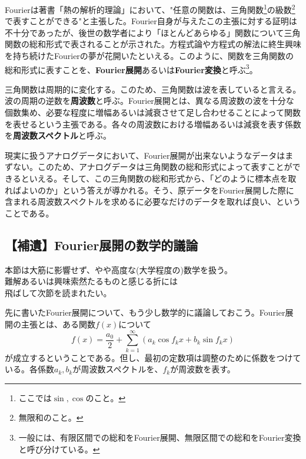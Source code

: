 Fourierは著書「熱の解析的理論」において、"任意の関数は、三角関数\footnote{ここでは$\sin,\cos$のこと。}の級数\footnote{無限和のこと。}で表すことができる"と主張した。Fourier自身が与えたこの主張に対する証明は不十分であったが、後世の数学者により「ほとんどあらゆる」関数について三角関数の総和形式で表されることが示された。方程式論や方程式の解法に終生興味を持ち続けたFourierの夢が花開いたといえる。このように、関数を三角関数の総和形式に表すことを、\textbf{Fourier展開}あるいは\textbf{Fourier変換}と呼ぶ\footnote{一般には、有限区間での総和をFourier展開、無限区間での総和をFourier変換と呼び分けている。}。

三角関数は周期的に変化する。このため、三角関数は波を表していると言える。波の周期の逆数を\textbf{周波数}と呼ぶ。Fourier展開とは、異なる周波数の波を十分な個数集め、必要な程度に増幅あるいは減衰させて足し合わせることによって関数を表せるという主張である。各々の周波数における増幅あるいは減衰を表す係数を\textbf{周波数スペクトル}と呼ぶ。

現実に扱うアナログデータにおいて、Fourier展開が出来ないようなデータはまずない。このため、アナログデータは三角関数の総和形式によって表すことができるといえる。そして、この三角関数の総和形式から、「どのように標本点を取ればよいのか」という答えが導かれる。そう、原データをFourier展開した際に含まれる周波数スペクトルを求めるに必要なだけのデータを取れば良い、ということである。

\subsection{【補遺】Fourier展開の数学的議論}
\begin{center}
\begin{minipage}[]{0.75\linewidth}
\begin{screen}
\begin{center}
本節は大筋に影響せず、やや高度な(大学程度の)数学を扱う。\\
難解あるいは興味索然たるものと感じる折には\\
飛ばして次節を読まれたい。
\end{center}
\end{screen}
\end{minipage}
\end{center}

先に書いたFourier展開について、もう少し数学的に議論しておこう。Fourier展開の主張とは、ある関数$f(x)$について
\begin{equation}
f(x)=\frac{a_0}{2} + \sum^{\infty}_{k=1} \left( a_k \cos f_kx + b_k \sin f_kx \right) \label{eq_2_1}
\end{equation}
が成立するということである。但し、最初の定数項は調整のために係数をつけている。各係数$a_k,b_k$が周波数スペクトルを、$f_k$が周波数を表す。

